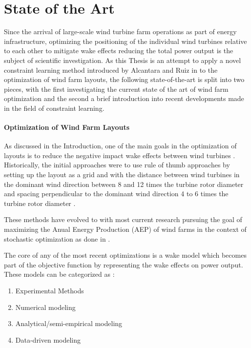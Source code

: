 
\chapter{State of the Art}\label{chapter:state_of_the_art}

Since the arrival of large-scale wind turbine farm operations as part of energy infrastructure, optimizing the positioning of the individual wind turbines relative to each other to mitigate wake effects reducing the total power output is the subject of scientific investigation. As this Thesis is an attempt to apply a novel constraint learning method introduced by Alcantara and Ruiz in \cite{ALCANTARA2023120895} to the optimization of wind farm layouts, the following state-of-the-art is split into two pieces, with the first investigating the current state of the art of wind farm optimization and the second a brief introduction into recent developments made in the field of constraint learning. 

\subsubsection{Optimization of Wind Farm Layouts}

As discussed in the Introduction, one of the main goals in the optimization of layouts is to reduce the negative impact wake effects between wind turbines \cite{KIM2024123383}. Historically, the initial approaches were to use rule of thumb approaches by setting up the layout as a grid and with the distance between wind turbines in the dominant wind direction  between 8 and 12 times the turbine rotor diameter and spacing perpendicular to the dominant wind direction 4 to 6 times the turbine rotor diameter \cite{AZLAN2021110047} \cite{hou_review_2019}.

These methods have evolved to with most current research pursuing the goal of maximizing the Anual Energy Production (AEP) of wind farms in the context of stochastic optimization as done in \cite{Sinner_2024} \cite{KIM2024123383}. 

The core of any of the most recent optimizations is a wake model which becomes part of the objective function by representing the wake effects on power output. These models can be categorized as \cite{WANG2024118508}: 

\begin{enumerate}
	\item Experimental Methods
	\item Numerical modeling
	\item Analytical/semi-empirical modeling
	\item Data-driven modeling
\end{enumerate}

